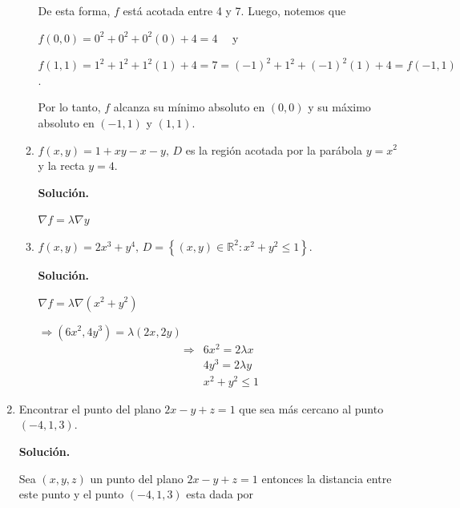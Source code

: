 \documentclass[fleqn, 12pt]{article}
\begin{document}
\begin{enumerate}
\begin{enumerate}
            De esta forma, $ f $ está acotada entre 4 y 7. Luego, notemos que 
            
            $ f(0,0) = 0^2 + 0^2 + 0^2 (0) + 4 = 4 \quad $ y 
            
            $ f(1,1) = 1^2 + 1^2 + 1^2 (1) + 4 = 7 = (-1)^2 + 1^2 + (-1)^2 (1) + 4 = f(-1,1) $.

            Por lo tanto, $ f $ alcanza su mínimo absoluto en $ (0,0) $ y su máximo absoluto en $ (-1,1) $ y $ (1,1) $.

            \item $ f(x,y) = 1 + xy - x - y, \, D $ es la región acotada por la parábola $ y = x^2 $ y la recta $ y = 4 $.

            \textbf{Solución.}
            
            $ \nabla f = \lambda \nabla y $

            \item $ f(x,y) = 2x^3 + y^4, \, D = \left\lbrace (x,y) \in \mathbb{R}^2 : x^2 + y^2 \leq 1 \right\rbrace $.

            \textbf{Solución.}
            
            $ \nabla f = \lambda \nabla (x^2 + y^2) $

            $ \Longrightarrow (6x^2, 4y^3) = \lambda (2x, 2y) $
            \begin{align}
                \Longrightarrow & 6x^2 = 2 \lambda x \\
                & 4y^3 = 2 \lambda y \\
                & x^2 + y^2 \leq 1
            \end{align}
            
            
            
        \end{enumerate}
        \item Encontrar el punto del plano $ 2x - y + z = 1 $ que sea más cercano al punto $ (-4,1,3) $.

        \textbf{Solución.}
        
        Sea $ (x,y,z) $ un punto del plano $ 2x - y + z = 1 $ entonces la distancia entre este punto y el punto $ (-4,1,3) $ esta dada por 


\end{enumerate}
\end{document}

